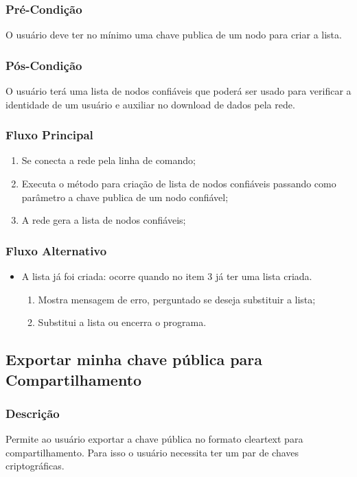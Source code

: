 \subsubsection{Pré-Condição}
O usuário deve ter no mínimo uma chave publica de um nodo para criar a lista.
\subsubsection{Pós-Condição}
O usuário terá uma lista de nodos confiáveis que poderá ser usado para verificar a identidade de um usuário e auxiliar no download de dados pela rede.
\subsubsection{Fluxo Principal}
\begin{enumerate}
    \item Se conecta a rede pela linha de comando;
    \item Executa o método para criação de lista de nodos confiáveis passando como parâmetro a chave publica de um nodo confiável;
    \item A rede gera a lista de nodos confiáveis;
\end{enumerate}
\subsubsection{Fluxo Alternativo}
\begin{itemize}
    \item A lista já foi criada: ocorre quando no item 3 já ter uma lista criada.
    \begin{enumerate}
        \item Mostra mensagem de erro, perguntado se deseja substituir a lista;
        \item Substitui a lista ou encerra o programa.
    \end{enumerate}
\end{itemize}


\subsection{Exportar minha chave pública para Compartilhamento}
\subsubsection{Descrição}
Permite ao usuário exportar a chave pública no formato cleartext para compartilhamento. Para isso o usuário necessita ter um par de chaves criptográficas. 

